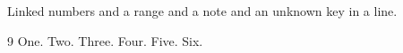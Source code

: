 \documentclass{article}
\begin{document}
Linked numbers \cite{b,a} and a range \cite{c,a,b} and a note \cite[p.~5]{e,a} and an unknown key \cite{nokey,f} in a line.

\begin{thebibliography}{9}
 One.
 Two.
 Three.
 Four.
 Five.
 Six.
\end{thebibliography}
\end{document}
